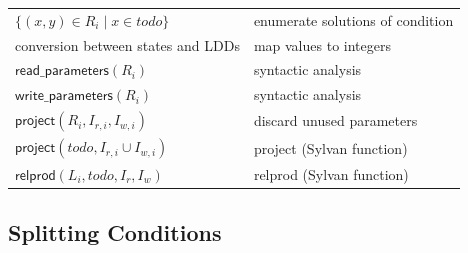 \documentclass{article}
\newcommand{\var}[1]{\ensuremath{\textit{#1}}}
\begin{document}
\begin{center}
\label{table:pbes_ingredients}
\begin{tabular}{ |l|l| }
\hline
$\{ (x,y) \in R_i \mid x \in todo \}$ & enumerate solutions of condition \\
conversion between states and LDDs & map values to integers \\
$\textsf{read\_parameters}(R_i)$ & syntactic analysis \\
$\textsf{write\_parameters}(R_i)$ & syntactic analysis \\
$\textsf{project}(R_i, I_{r,i}, I_{w,i})$ & discard unused parameters \\
$\textsf{project}(\var{todo}, I_{r,i} \cup I_{w,i})$ & \textsf{project} (Sylvan function) \\
$\textsf{relprod}(L_i, \var{todo}, I_r, I_w)$ & \textsf{relprod} (Sylvan function) \\
\hline
\end{tabular}
\end{center}

\subsection{Splitting Conditions}
\end{document}
